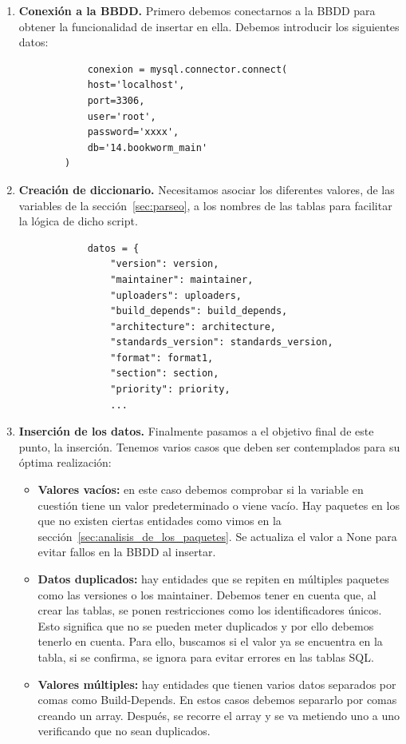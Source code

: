 \documentclass[a4paper, 12pt]{book}
\begin{document}
\begin{enumerate}
		\item \textbf{Conexión a la BBDD.} Primero debemos conectarnos a la BBDD para obtener la funcionalidad de insertar en ella. Debemos introducir los siguientes datos:
		\begin{verbatim}
			conexion = mysql.connector.connect(
			host='localhost',
			port=3306,
			user='root',
			password='xxxx',
			db='14.bookworm_main'
		)
		\end{verbatim} 
		
		\item \textbf{Creación de diccionario.} Necesitamos asociar los diferentes valores, de las variables de la sección~\ref{sec:parseo}, a los nombres de las tablas para facilitar la lógica de dicho script.
		\begin{verbatim}
			datos = {
				"version": version,
				"maintainer": maintainer,
				"uploaders": uploaders,
				"build_depends": build_depends,
				"architecture": architecture,
				"standards_version": standards_version,
				"format": format1,
				"section": section,
				"priority": priority,
				...
		\end{verbatim} 
		
		\item \textbf{Inserción de los datos.} Finalmente pasamos a el objetivo final de este punto, la inserción. Tenemos varios casos que deben ser contemplados para su óptima realización:
		
		\begin{itemize}
			\item \textbf{Valores vacíos:} en este caso debemos comprobar si la variable en cuestión tiene un valor predeterminado o viene vacío. Hay paquetes en los que no existen ciertas entidades como vimos en la sección~\ref{sec:analisis_de_los_paquetes}. Se actualiza el valor a None para evitar fallos en la BBDD al insertar.
			
			\item \textbf{Datos duplicados: } hay entidades que se repiten en múltiples paquetes como las versiones o los maintainer. Debemos tener en cuenta que, al crear las tablas, se ponen restricciones como los identificadores únicos. Esto significa que no se pueden meter duplicados y por ello debemos tenerlo en cuenta. Para ello, buscamos si el valor ya se encuentra en la tabla, si se confirma, se ignora para evitar errores en las tablas SQL.
			
			\item \textbf{Valores múltiples: } hay entidades que tienen varios datos separados por comas como Build-Depends. En estos casos debemos separarlo por comas creando un array. Después, se recorre el array y se va metiendo uno a uno verificando que no sean duplicados.
			

\end{itemize}
\end{enumerate}
\end{document}
